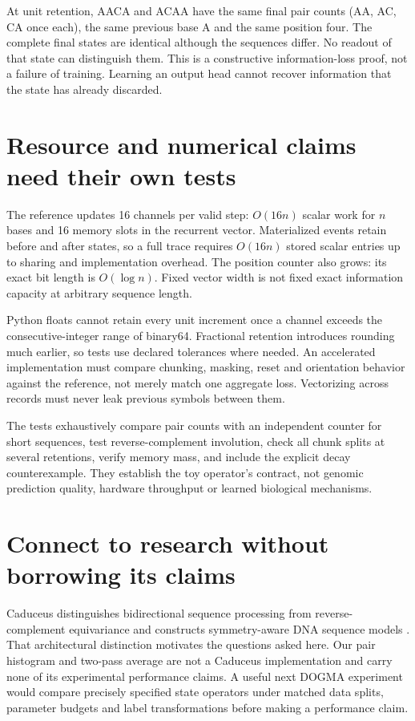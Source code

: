 
At unit retention, AACA and ACAA have the same final pair counts (AA, AC,
CA once each), the same previous base A and the same position four.
The complete final states are identical although the sequences differ.
No readout of that state can distinguish them. This is a constructive
information-loss proof, not a failure of training. Learning an output head
cannot recover information that the state has already discarded.

\section{Resource and numerical claims need their own tests}
The reference updates 16 channels per valid step: $O(16n)$ scalar work for
$n$ bases and 16 memory slots in the recurrent vector. Materialized events
retain before and after states, so a full trace requires $O(16n)$ stored
scalar entries up to sharing and implementation overhead. The position counter
also grows: its exact bit length is $O(\log n)$. Fixed vector width is not
fixed exact information capacity at arbitrary sequence length.

Python floats cannot retain every unit increment once a channel exceeds
the consecutive-integer range of binary64. Fractional retention introduces
rounding much earlier, so tests use declared tolerances where needed.
An accelerated implementation must compare chunking, masking, reset and
orientation behavior against the reference, not merely match one aggregate
loss. Vectorizing across records must never leak previous symbols between them.

The tests exhaustively compare pair counts with an independent counter for
short sequences, test reverse-complement involution, check all chunk splits
at several retentions, verify memory mass, and include the explicit decay
counterexample. They establish the toy operator's contract, not genomic
prediction quality, hardware throughput or learned biological mechanisms.

\section{Connect to research without borrowing its claims}
Caduceus distinguishes bidirectional sequence processing from reverse-complement
equivariance and constructs symmetry-aware DNA sequence models \cite{caduceus}.
That architectural distinction motivates the questions asked here. Our pair
histogram and two-pass average are not a Caduceus implementation and carry
none of its experimental performance claims. A useful next DOGMA experiment
would compare precisely specified state operators under matched data splits,
parameter budgets and label transformations before making a performance claim.


